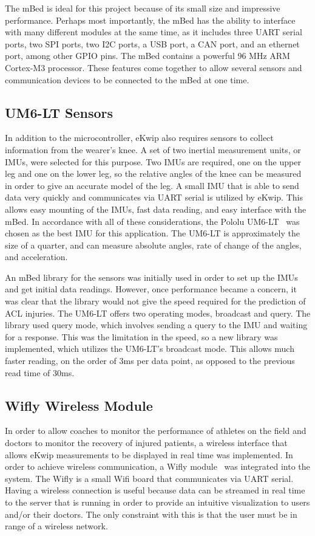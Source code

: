 The mBed is ideal for this project because of its small size and impressive performance. Perhaps most importantly, the mBed has the ability to interface with many different modules at the same time, as it includes three UART serial ports, two SPI ports, two I2C ports, a USB port, a CAN port, and an ethernet port, among other GPIO pins. The mBed contains a powerful 96 MHz ARM Cortex-M3 processor. These features come together to allow several sensors and communication devices to be connected to the mBed at one time.

\subsection {UM6-LT Sensors}
In addition to the microcontroller, eKwip also requires sensors to collect information from the wearer's knee. A set of two inertial measurement units, or IMUs, were selected for this purpose. Two IMUs are required, one on the upper leg and one on the lower leg, so the relative angles of the knee can be measured in order to give an accurate model of the leg. A small IMU that is able to send data very quickly and communicates via UART serial is utilized by eKwip. This allows easy mounting of the IMUs, fast data reading, and easy interface with the mBed. In accordance with all of these considerations, the Pololu UM6-LT~\cite{um6} was chosen as the best IMU for this application. The UM6-LT is approximately the size of a quarter, and can measure absolute angles, rate of change of the angles, and acceleration.

An mBed library for the sensors was initially used in order to set up the IMUs and get initial data readings. However, once performance became a concern, it was clear that the library would not give the speed required for the prediction of ACL injuries. The UM6-LT offers two operating modes, broadcast and query. The library used query mode, which involves sending a query to the IMU and waiting for a response. This was the limitation in the speed, so a new library was implemented, which utilizes the UM6-LT's broadcast mode. This allows much faster reading, on the order of 3ms per data point, as opposed to the previous read time of 30ms.

\subsection {Wifly Wireless Module}
In order to allow coaches to monitor the performance of athletes on the field and doctors to monitor the recovery of injured patients, a wireless interface that allows eKwip measurements to be displayed in real time was implemented. In order to achieve wireless communication, a Wifly module~\cite{wifly} was integrated into the system. The Wifly is a small Wifi board that communicates via UART serial. Having a wireless connection is useful because data can be streamed in real time to the server that is running in order to provide an intuitive visualization to users and/or their doctors. The only constraint with this is that the user must be in range of a wireless network.

